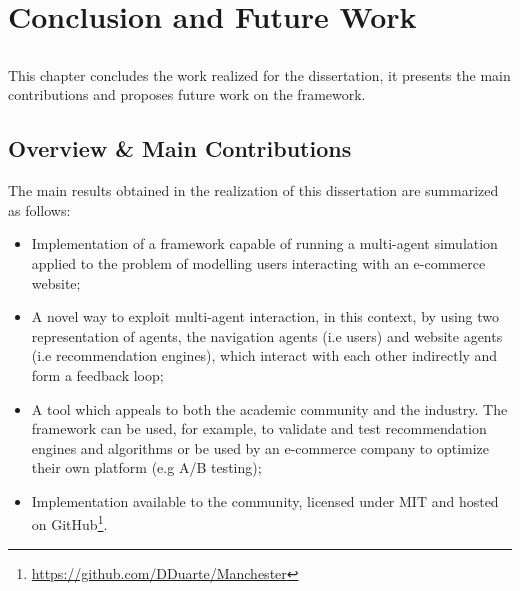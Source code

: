 \chapter{Conclusion and Future Work} \label{chap:conclusion}

\section*{}

This chapter concludes the work realized for the dissertation, it presents the 
main contributions and proposes future work on the framework.



\section{Overview \& Main Contributions}

The main results obtained in the realization of this dissertation are 
summarized as follows:

\begin{itemize}
    \item Implementation of a framework capable of running a multi-agent 
    simulation applied to the problem of modelling users interacting with an 
    e-commerce website;
    \item A novel way to exploit multi-agent interaction, in this context, by 
    using two representation of agents, the navigation agents (i.e users) and 
    website agents (i.e recommendation engines), which interact with each other 
    indirectly and form a feedback loop;
    \item A tool which appeals to both the academic community and the industry. 
    The framework can be used, for example, to validate and test recommendation 
    engines and algorithms or be used by an e-commerce company to optimize 
    their own platform (e.g A/B testing);
    \item Implementation available to the community, licensed under MIT and 
    hosted on GitHub\footnote{\url{https://github.com/DDuarte/Manchester}}.
\end{itemize}

